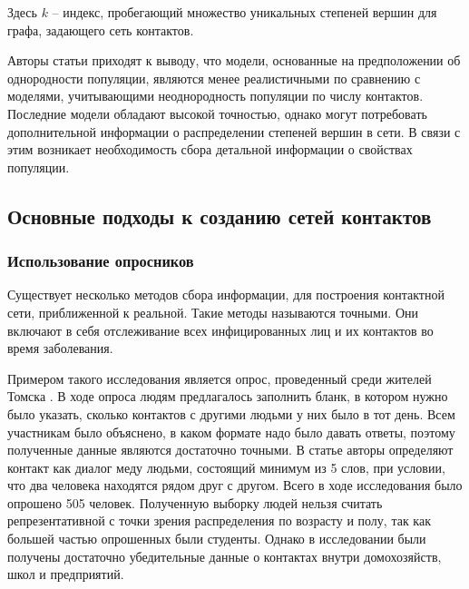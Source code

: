 \documentclass[14pt,a4paper]{article}
\begin{document}
Здесь $k$ -- индекс, пробегающий множество уникальных степеней вершин для графа, задающего сеть контактов.

Авторы статьи приходят к выводу, что модели, основанные на предположении об однородности популяции, являются менее реалистичными по сравнению с моделями, учитывающими неоднородность популяции по числу контактов. Последние модели обладают высокой точностью, однако могут потребовать дополнительной информации о распределении степеней вершин в сети. В связи с этим возникает необходимость сбора детальной информации о свойствах популяции.

\subsection{Основные подходы к созданию сетей контактов}

\subsubsection{Использование опросников}

Существует несколько методов сбора информации, для построения контактной сети, приближенной к реальной. Такие методы называются точными. Они включают в себя отслеживание всех инфицированных лиц и их контактов во время заболевания\cite{Klovdahl}.

Примером такого исследования является опрос, проведенный среди жителей Томска \cite{Tomsk}. В ходе опроса людям предлагалось заполнить бланк, в котором нужно было указать, сколько контактов с другими людьми у них было в тот день. Всем участникам было объяснено, в каком формате надо было давать ответы, поэтому полученные данные являются достаточно точными. В статье авторы определяют контакт как диалог меду людьми, состоящий минимум из 5 слов, при условии, что два человека находятся рядом друг с другом. Всего в ходе исследования было опрошено 505 человек. Полученную выборку людей нельзя считать репрезентативной с точки зрения распределения по возрасту и полу, так как большей частью опрошенных были студенты. Однако в исследовании были получены достаточно убедительные данные о контактах внутри домохозяйств, школ и предприятий. 
\end{document}
